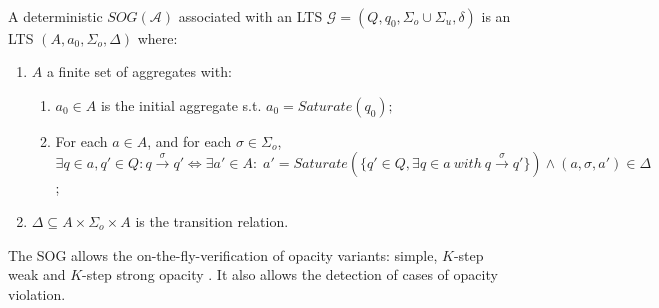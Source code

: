 \begin{definition} \mbox{} \\
\small
A deterministic $SOG (\mathcal{A})$  associated with an LTS $\mathcal{G}= (Q,q_{0},\Sigma_{o}\cup\Sigma_{u},\delta)$ is an LTS  $(A,a_{0},\Sigma_{o},\Delta)$ where:
\vspace{-0.3cm}
\begin{enumerate}
\item \label{def:SOG:dnodes}$A$ a finite set of aggregates with:
\begin{enumerate}
\item \label{def:SOG:dnodes1} $a_0 \in A$ is the initial aggregate s.t. $a_0=Saturate(q_{0}) \text{;}$
\item \label{def:SOG:dnodes2} For each $a \in  A$, and for each $\sigma\in \Sigma_{o}$, $\exists q\in a, q'\in Q \colon q
\xrightarrow{\sigma} q' \Leftrightarrow \exists a'\in A:\; a'=Saturate (\{q'\in Q, \exists q\in a \: with \:
q \xrightarrow{\sigma}q'\}) \wedge (a,\sigma,a') \in \Delta$;
\end{enumerate}
\item \label{def:SOG:darcs} $\Delta \subseteq A\times
\Sigma_{o} \times A$  is the transition relation.
\end{enumerate}
\end{definition}
\vspace{-0.3cm}
The SOG allows the on-the-fly-verification of opacity variants: simple, $K$-step weak and $K$-step strong opacity \cite{bourouis2015checking}. It also allows the detection of cases of opacity violation.  